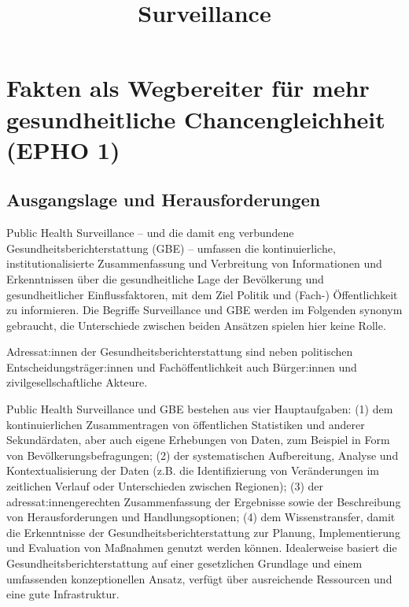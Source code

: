 \documentclass{article}
\begin{document}
\title{Surveillance}

\maketitle


\section{Fakten als Wegbereiter für mehr gesundheitliche Chancengleichheit (EPHO 1)}\label{H7538379}



\subsection{Ausgangslage und Herausforderungen}\label{H1152577}



Public Health Surveillance – und die damit eng verbundene Gesundheitsberichterstattung (GBE) – umfassen die kontinuierliche, institutionalisierte Zusammenfassung und Verbreitung von Informationen und Erkenntnissen über die gesundheitliche Lage der Bevölkerung und gesundheitlicher Einflussfaktoren, mit dem Ziel Politik und (Fach-) Öffentlichkeit zu informieren. Die Begriffe Surveillance und GBE werden im Folgenden synonym gebraucht, die Unterschiede zwischen beiden Ansätzen spielen hier keine Rolle.


Adressat:innen der Gesundheitsberichterstattung sind neben politischen Entscheidungsträger:innen und Fachöffentlichkeit auch Bürger:innen und zivilgesellschaftliche Akteure.


Public Health Surveillance und GBE bestehen aus vier Hauptaufgaben: (1) dem kontinuierlichen Zusammentragen von öffentlichen Statistiken und anderer Sekundärdaten, aber auch eigene Erhebungen von Daten, zum Beispiel in Form von Bevölkerungsbefragungen; (2) der systematischen Aufbereitung, Analyse und Kontextualisierung der Daten (z.B. die Identifizierung von Veränderungen im zeitlichen Verlauf oder Unterschieden zwischen Regionen); (3) der adressat:innengerechten Zusammenfassung der Ergebnisse sowie der Beschreibung von Herausforderungen und Handlungsoptionen; (4) dem Wissenstransfer, damit die Erkenntnisse der Gesundheitsberichterstattung zur Planung, Implementierung und Evaluation von Maßnahmen genutzt werden können. Idealerweise basiert die Gesundheitsberichterstattung auf einer gesetzlichen Grundlage und einem umfassenden konzeptionellen Ansatz, verfügt über ausreichende Ressourcen und eine gute Infrastruktur.
\end{document}
